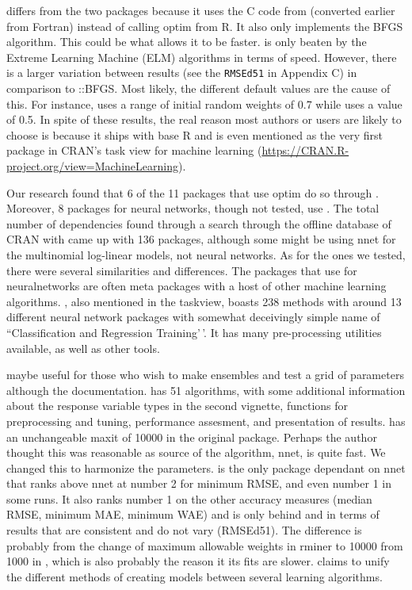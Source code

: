  \citep{R-nnet} differs from the two packages because it
uses the C code from  (converted earlier from Fortran)
instead of calling optim from R. It also only implements the BFGS
algorithm. This could be what allows it to be faster.  is
only beaten by the Extreme Learning Machine (ELM) algorithms in terms of
speed. However, there is a larger variation between results (see the
\texttt{RMSEd51} in Appendix C) in comparison to
::BFGS. Most likely, the different default values are
the cause of this. For instance,  uses a range of initial
random weights of 0.7 while  uses a value of 0.5. In
spite of these results, the real reason most authors or users are likely
to choose  is because it ships with base R and is even
mentioned as the very first package in CRAN's task view for machine
learning (\url{https://CRAN.R-project.org/view=MachineLearning}).

Our research found that 6 of the 11 packages that use optim do so
through . Moreover, 8 packages for neural networks, though
not tested, use . The total number of 
dependencies found through a search through the offline database of CRAN
with  came up with 136 packages, although some might
be using nnet for the multinomial log-linear models, not neural
networks. As for the ones we tested, there were several similarities and
differences. The packages that use  for neuralnetworks are
often meta packages with a host of other machine learning algorithms.
 \citep{R-caret}, also mentioned in the taskview, boasts
238 methods with around 13 different neural network packages with
somewhat deceivingly simple name of ``Classification and Regression
Training'\,'. It has many pre-processing utilities available, as well as
other tools.

 \citep{R-EnsembleBase} maybe useful for those who
wish to make ensembles and test a grid of parameters although the
documentation.  \citep{R-MachineShop} has 51
algorithms, with some additional information about the response variable
types in the second vignette, functions for preprocessing and tuning,
performance assesment, and presentation of results.
 \citep{R-radiant.model} has an unchangeable
maxit of 10000 in the original package. Perhaps the author thought this
was reasonable as source of the algorithm, nnet, is quite fast. We
changed this to harmonize the parameters. 
\citep{R-rminer} is the only package dependant on nnet that ranks above
nnet at number 2 for minimum RMSE, and even number 1 in some runs. It
also ranks number 1 on the other accuracy measures (median RMSE, minimum
MAE, minimum WAE) and is only behind  and
 in terms of results that are consistent and do not
vary (RMSEd51). The difference is probably from the change of maximum
allowable weights in rminer to 10000 from 1000 in , which
is also probably the reason it its fits are slower. 
\citep{R-traineR} claims to unify the different methods of creating
models between several learning algorithms.

